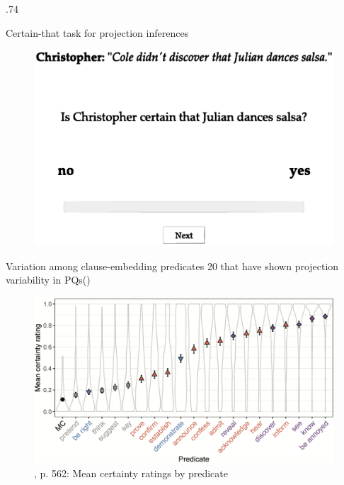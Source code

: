 \documentclass[final, table]{beamer}
\newlength{\colwidth}
\newlength{\vboxsep}
\begin{document}
\begin{frame}[t]
\begin{columns}[t]
\begin{column}{.74\colwidth}
\begin{normalbox}{Certain-that task for projection inferences}
				\begin{figure}[h]
					\centering
					\includegraphics[width=.6\linewidth]{task-1n-proj.eps}
					\label{fig:task}
				\end{figure}

				
			\end{normalbox}

			\vspace{\vboxsep}
			\begin{normalbox}{Variation among clause-embedding predicates}
				20  that have shown projection variability in PQs\newline (\citealt{degen_are_2022})

				\begin{figure}[h]
					\centering
					\includegraphics[width=.95\linewidth]{degen-tonhauser.png}
					\caption{\citealt{degen_are_2022}, p. 562: Mean certainty ratings by predicate}
					\label{fig:task}
				\end{figure}
				\vspace{-.8\baselineskip}
			\end{normalbox}


\end{column}
\end{columns}
\end{frame}
\end{document}
